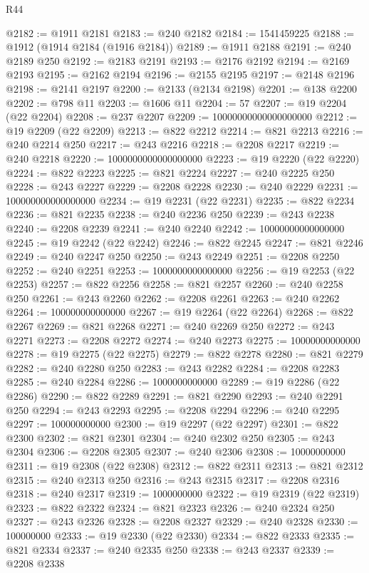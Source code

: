 \begin{lexlean}{R44}
\begin{coremodule}
{@2182 := @1911 @2181
@2183 := @240 @2182
@2184 := 1541459225
@2188 := @1912 (@1914 @2184 (@1916 @2184))
@2189 := @1911 @2188
@2191 := @240 @2189 @250
@2192 := @2183 @2191
@2193 := @2176 @2192
@2194 := @2169 @2193
@2195 := @2162 @2194
@2196 := @2155 @2195
@2197 := @2148 @2196
@2198 := @2141 @2197
@2200 := @2133 (@2134 @2198)
@2201 := @138 @2200
@2202 := @798 @11
@2203 := @1606 @11
@2204 := 57
@2207 := @19 @2204 (@22 @2204)
@2208 := @237 @2207
@2209 := 10000000000000000000
@2212 := @19 @2209 (@22 @2209)
@2213 := @822 @2212
@2214 := @821 @2213
@2216 := @240 @2214 @250
@2217 := @243 @2216
@2218 := @2208 @2217
@2219 := @240 @2218
@2220 := 1000000000000000000
@2223 := @19 @2220 (@22 @2220)
@2224 := @822 @2223
@2225 := @821 @2224
@2227 := @240 @2225 @250
@2228 := @243 @2227
@2229 := @2208 @2228
@2230 := @240 @2229
@2231 := 100000000000000000
@2234 := @19 @2231 (@22 @2231)
@2235 := @822 @2234
@2236 := @821 @2235
@2238 := @240 @2236 @250
@2239 := @243 @2238
@2240 := @2208 @2239
@2241 := @240 @2240
@2242 := 10000000000000000
@2245 := @19 @2242 (@22 @2242)
@2246 := @822 @2245
@2247 := @821 @2246
@2249 := @240 @2247 @250
@2250 := @243 @2249
@2251 := @2208 @2250
@2252 := @240 @2251
@2253 := 1000000000000000
@2256 := @19 @2253 (@22 @2253)
@2257 := @822 @2256
@2258 := @821 @2257
@2260 := @240 @2258 @250
@2261 := @243 @2260
@2262 := @2208 @2261
@2263 := @240 @2262
@2264 := 100000000000000
@2267 := @19 @2264 (@22 @2264)
@2268 := @822 @2267
@2269 := @821 @2268
@2271 := @240 @2269 @250
@2272 := @243 @2271
@2273 := @2208 @2272
@2274 := @240 @2273
@2275 := 10000000000000
@2278 := @19 @2275 (@22 @2275)
@2279 := @822 @2278
@2280 := @821 @2279
@2282 := @240 @2280 @250
@2283 := @243 @2282
@2284 := @2208 @2283
@2285 := @240 @2284
@2286 := 1000000000000
@2289 := @19 @2286 (@22 @2286)
@2290 := @822 @2289
@2291 := @821 @2290
@2293 := @240 @2291 @250
@2294 := @243 @2293
@2295 := @2208 @2294
@2296 := @240 @2295
@2297 := 100000000000
@2300 := @19 @2297 (@22 @2297)
@2301 := @822 @2300
@2302 := @821 @2301
@2304 := @240 @2302 @250
@2305 := @243 @2304
@2306 := @2208 @2305
@2307 := @240 @2306
@2308 := 10000000000
@2311 := @19 @2308 (@22 @2308)
@2312 := @822 @2311
@2313 := @821 @2312
@2315 := @240 @2313 @250
@2316 := @243 @2315
@2317 := @2208 @2316
@2318 := @240 @2317
@2319 := 1000000000
@2322 := @19 @2319 (@22 @2319)
@2323 := @822 @2322
@2324 := @821 @2323
@2326 := @240 @2324 @250
@2327 := @243 @2326
@2328 := @2208 @2327
@2329 := @240 @2328
@2330 := 100000000
@2333 := @19 @2330 (@22 @2330)
@2334 := @822 @2333
@2335 := @821 @2334
@2337 := @240 @2335 @250
@2338 := @243 @2337
@2339 := @2208 @2338
}
\end{coremodule}
\end{lexlean}
